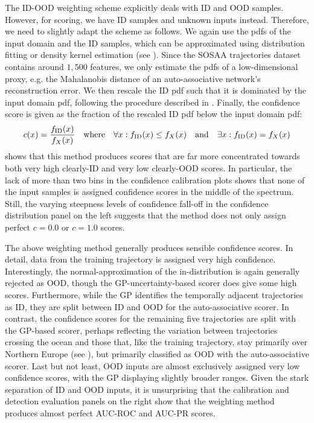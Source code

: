 \noindent The ID-OOD weighting scheme explicitly deals with ID and OOD samples. However, for scoring, we have ID samples and unknown inputs instead. Therefore, we need to slightly adapt the scheme as follows. We again use the pdfs of the input domain and the ID samples, which can be approximated using distribution fitting or density kernel estimation (see ). Since the SOSAA trajectories dataset contains around $1,500$ features, we only estimate the pdfs of a low-dimensional proxy, e.g. the Mahalanobis distance of an auto-associative network's reconstruction error. We then rescale the ID pdf such that it is dominated by the input domain pdf, following the procedure described in . Finally, the confidence score is given as the fraction of the rescaled ID pdf below the input domain pdf:
\begin{equation*}
    c(x) = \frac{f_{\text{ID}}(x)}{f_{X}(x)} \quad \text{where} \quad \forall x \mathrel{:} f_{\text{ID}}(x) \leq f_{X}(x) \quad \text{and} \quad \exists x \mathrel{:} f_{\text{ID}}(x) = f_{X}(x)
\end{equation*}
\noindent {} shows that this method produces scores that are far more concentrated towards both very high clearly-ID and very low clearly-OOD scores. In particular, the lack of more than two bins in the confidence calibration plots shows that none of the input samples is assigned confidence scores in the middle of the spectrum. Still, the varying steepness levels of confidence fall-off in the confidence distribution panel on the left suggests that the method does not only assign perfect $c = 0.0$ or $c = 1.0$ scores.

The above weighting method generally produces sensible confidence scores. In detail, data from the training trajectory is assigned very high confidence. Interestingly, the normal-approximation of the in-distribution is again generally rejected as OOD, though the GP-uncertainty-based scorer does give some high scores. Furthermore, while the GP identifies the temporally adjacent trajectories as ID, they are split between ID and OOD for the auto-associative scorer. In contrast, the confidence scores for the remaining five trajectories are split with the GP-based scorer, perhaps reflecting the variation between trajectories crossing the ocean and those that, like the training trajectory, stay primarily over Northern Europe (see ), but primarily classified as OOD with the auto-associative scorer. Last but not least, OOD inputs are almost exclusively assigned very low confidence scores, with the GP displaying slightly broader ranges. Given the stark separation of ID and OOD inputs, it is unsurprising that the calibration and detection evaluation panels on the right show that the weighting method produces almost perfect AUC-ROC and AUC-PR scores.

